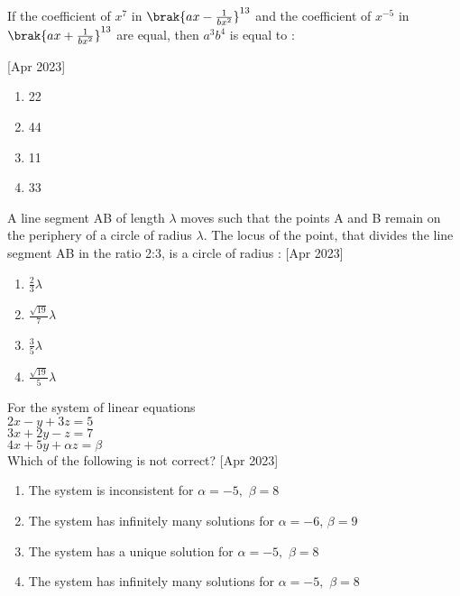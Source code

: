    \item If the coefficient of  $x^7$ in $\brak{ax-\frac{1}{bx^2}}^{13}$ and the coefficient of $x^{-5}$ in $\brak{ax+\frac{1}{bx^2}}^{13}$ are equal, then $a^3b^4$ is equal to :
\begin{multicols}{1}
 \hfill{[Apr 2023]}
            \begin{enumerate}
              \item 22
              \item  44
              \item  11
              \item 33
            \end{enumerate}
        \end{multicols}
    \item A line segment AB of length $\lambda$ moves such that the points A and B remain on the periphery of a circle of radius $\lambda$. The locus of the point, that divides the line segment AB in the ratio 2:3, is a circle of radius :
     \hfill{[Apr 2023]}
    \begin{multicols}{1}
            \begin{enumerate}
              \item $\frac{2}{3}\lambda$
              \item   $\frac{\sqrt{19}}{7}\lambda$
              \item   $\frac{3}{5}\lambda$
              \item  $\frac{\sqrt{19}}{5}\lambda$
            \end{enumerate}
        \end{multicols}
    \item For the system of linear equations \\
    $2x-y+3z=5$\\
    $3x+2y-z=7$\\
    $4x+5y+\alpha z=\beta$\\
    Which of the following is not correct?
     \hfill{[Apr 2023]}
    \begin{multicols}{1}
            \begin{enumerate}
              \item The system is inconsistent for $\alpha =-5,$ $\beta = 8$
              \item The system has infinitely many solutions for $\alpha =-6$, $\beta = 9$
              \item The system has a unique solution  for $\alpha =-5,$ $\beta = 8$
              \item The system has infinitely many solutions for $\alpha =-5,$ $\beta = 8$
            \end{enumerate}
        \end{multicols}
     
